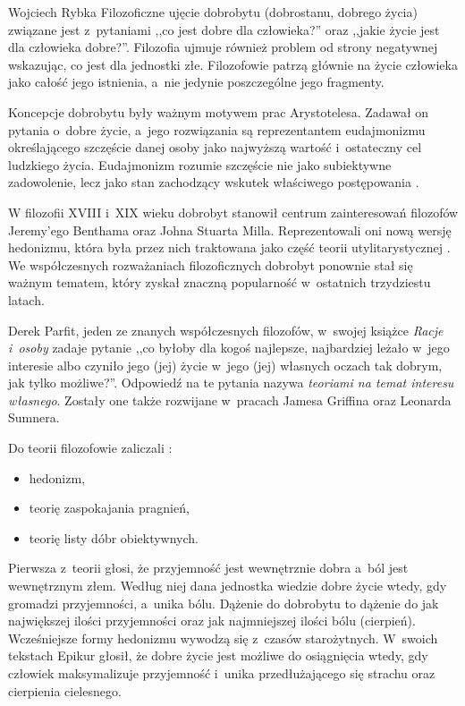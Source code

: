 \begin{artplenv}{Wojciech Rybka}
Filozoficzne ujęcie dobrobytu (dobrostanu, dobrego życia) związane jest z~pytaniami ,,co jest dobre dla człowieka?'' oraz
,,jakie życie jest dla człowieka dobre?''. Filozofia ujmuje również problem od strony negatywnej wskazując, co jest dla
jednostki złe. Filozofowie patrzą głównie na życie człowieka jako całość jego istnienia, a~nie jedynie poszczególne
jego fragmenty. 

Koncepcje dobrobytu były ważnym motywem prac Arystotelesa. Zadawał on pytania o~dobre życie, a~jego rozwiązania są
reprezentantem eudajmonizmu określającego szczęście danej osoby jako najwyższą wartość i~ostateczny cel ludzkiego
życia. Eudajmonizm rozumie szczęście nie jako subiektywne zadowolenie, lecz jako stan zachodzący wskutek właściwego
postępowania
\parencite{moleda_kantowska_2009}.

W filozofii XVIII i~XIX wieku dobrobyt stanowił centrum zainteresowań filozofów Jeremy'ego Benthama oraz Johna Stuarta
Milla. Reprezentowali oni nową wersję hedonizmu, która była przez nich traktowana jako część teorii utylitarystycznej
\parencite{brey_well-being_2012}.
We współczesnych rozważaniach filozoficznych dobrobyt ponownie stał się ważnym
tematem, który zyskał znaczną popularność w~ostatnich trzydziestu latach.

Derek Parfit, jeden ze znanych współczesnych filozofów, w~swojej książce \textit{Racje i~osoby}
\parencite*{parfit_racje_2012}
zadaje pytanie ,,co byłoby dla kogoś najlepsze, najbardziej leżało w~jego interesie
albo czyniło jego (jej) życie w~jego (jej) własnych oczach tak dobrym, jak tylko możliwe?''. Odpowiedź na te pytania
nazywa \textit{teoriami na temat interesu własnego}. Zostały one także rozwijane w~pracach Jamesa Griffina oraz
Leonarda Sumnera. 

Do teorii filozofowie zaliczali
\parencite{brey_well-being_2012}:

\begin{itemize}
\item hedonizm,
\item teorię zaspokajania pragnień,
\item teorię listy dóbr obiektywnych.
\end{itemize}

Pierwsza z~teorii głosi, że przyjemność jest wewnętrznie dobra a~ból jest wewnętrznym złem. Według niej dana jednostka
wiedzie dobre życie wtedy, gdy gromadzi przyjemności, a~unika bólu. Dążenie do dobrobytu to dążenie do jak największej
ilości przyjemności oraz jak najmniejszej ilości bólu (cierpień). Wcześniejsze formy hedonizmu wywodzą się z~czasów
starożytnych. W~swoich tekstach Epikur głosił, że dobre życie jest możliwe do osiągnięcia wtedy, gdy człowiek
maksymalizuje przyjemność i~unika przedłużającego się strachu oraz cierpienia cielesnego. 


\end{artplenv}
